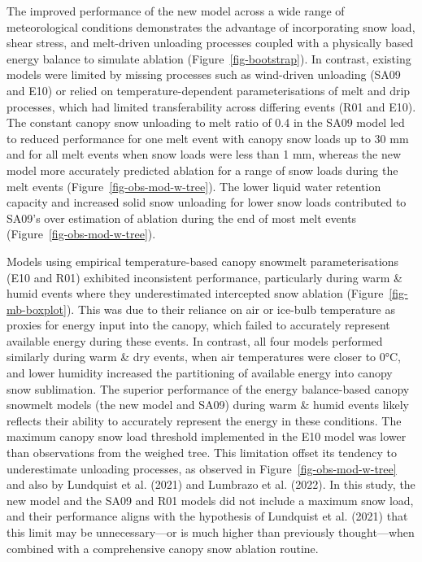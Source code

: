 \documentclass[
]{agujournal2019}
\begin{document}
The improved performance of the new model across a wide range of
meteorological conditions demonstrates the advantage of incorporating
snow load, shear stress, and melt-driven unloading processes coupled
with a physically based energy balance to simulate ablation
(Figure~\ref{fig-bootstrap}). In contrast, existing models were limited
by missing processes such as wind-driven unloading (SA09 and E10) or
relied on temperature-dependent parameterisations of melt and drip
processes, which had limited transferability across differing events
(R01 and E10). The constant canopy snow unloading to melt ratio of 0.4
in the SA09 model led to reduced performance for one melt event with
canopy snow loads up to 30 mm and for all melt events when snow loads
were less than 1 mm, whereas the new model more accurately predicted
ablation for a range of snow loads during the melt events
(Figure~\ref{fig-obs-mod-w-tree}). The lower liquid water retention
capacity and increased solid snow unloading for lower snow loads
contributed to SA09's over estimation of ablation during the end of most
melt events (Figure~\ref{fig-obs-mod-w-tree}).

Models using empirical temperature-based canopy snowmelt
parameterisations (E10 and R01) exhibited inconsistent performance,
particularly during warm \& humid events where they underestimated
intercepted snow ablation (Figure~\ref{fig-mb-boxplot}). This was due to
their reliance on air or ice-bulb temperature as proxies for energy
input into the canopy, which failed to accurately represent available
energy during these events. In contrast, all four models performed
similarly during warm \& dry events, when air temperatures were closer
to 0°C, and lower humidity increased the partitioning of available
energy into canopy snow sublimation. The superior performance of the
energy balance-based canopy snowmelt models (the new model and SA09)
during warm \& humid events likely reflects their ability to accurately
represent the energy in these conditions. The maximum canopy snow load
threshold implemented in the E10 model was lower than observations from
the weighed tree. This limitation offset its tendency to underestimate
unloading processes, as observed in Figure~\ref{fig-obs-mod-w-tree} and
also by Lundquist et al. (2021) and Lumbrazo et al. (2022). In this
study, the new model and the SA09 and R01 models did not include a
maximum snow load, and their performance aligns with the hypothesis of
Lundquist et al. (2021) that this limit may be unnecessary---or is much
higher than previously thought---when combined with a comprehensive
canopy snow ablation routine.
\end{document}
